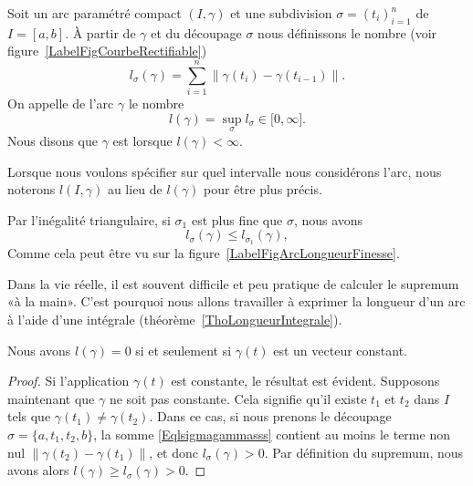 \newcommand{\CaptionFigCourbeRectifiable}{La longueur d'un découpage. La somme des longueurs des segments droits est facile à calculer.}

\begin{definition}      \label{DEFooDNZWooXmxhsU}
    Soit un arc paramétré compact $(I,\gamma)$ et une subdivision $\sigma=(t_i)_{i=1}^n$ de $I=[a,b]$. À partir de $\gamma$ et du découpage $\sigma$ nous définissons le nombre (voir figure~\ref{LabelFigCourbeRectifiable})
    \begin{equation}        \label{Eqlsigmagammasss}
        l_{\sigma}(\gamma)=\sum_{i=1}^n\big\| \gamma(t_i)-\gamma(t_{i-1}) \big\|.
    \end{equation}
    On appelle  de l'arc $\gamma$ le nombre
    \begin{equation}
        l(\gamma)=\sup_{\sigma}l_{\sigma}\in\mathopen[ 0 , \infty \mathclose].
    \end{equation}
    Nous disons que $\gamma$ est  lorsque $l(\gamma)<\infty$.
\end{definition}
Lorsque nous voulons spécifier sur quel intervalle nous considérons l'arc, nous noterons $l(I,\gamma)$ au lieu de $l(\gamma)$ pour être plus précis.

Par l'inégalité triangulaire, si $\sigma_1$ est plus fine que $\sigma$, nous avons
\begin{equation}
    l_{\sigma}(\gamma)\leq l_{\sigma_1}(\gamma),
\end{equation}
Comme cela peut être vu sur la figure~\ref{LabelFigArcLongueurFinesse}.
\newcommand{\CaptionFigArcLongueurFinesse}{Il est visible que la longueur donnée par l'approximation par des petits segments (verts) est plus longue et plus précise que celle donnée par les longs segments (rouge).}


Dans la vie réelle, il est souvent difficile et peu pratique de calculer le supremum «à la main». C'est pourquoi nous allons travailler à exprimer la longueur d'un arc à l'aide d'une intégrale (théorème~\ref{ThoLongueurIntegrale}).

\begin{lemma}
    Nous avons $l(\gamma)=0$ si et seulement si $\gamma(t)$ est un vecteur constant.
\end{lemma}

\begin{proof}
    Si l'application $\gamma(t)$ est constante, le résultat est évident. Supposons maintenant que $\gamma$ ne soit pas constante. Cela signifie qu'il existe $t_1$ et $t_2$ dans $I$ tels que $\gamma(t_1)\neq \gamma(t_2)$. Dans ce cas, si nous prenons le découpage $\sigma=\{ a,t_1,t_2,b \}$, la somme \eqref{Eqlsigmagammasss} contient au moins le terme non nul $\| \gamma(t_2)-\gamma(t_1) \|$, et donc $l_{\sigma}(\gamma)>0$. Par définition du supremum, nous avons alors $l(\gamma)\geq l_{\sigma}(\gamma)>0$.
\end{proof}

